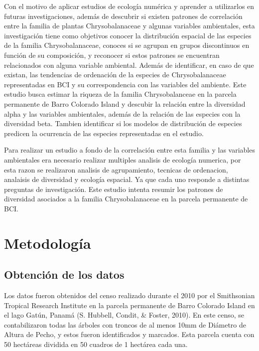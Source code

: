 \documentclass[11pt,]{article}
\begin{document}
Con el motivo de aplicar estudios de ecología numérica y aprender a
utilizarlos en futuras investigaciones, además de descubrir si existen
patrones de correlación entre la familia de plantas Chrysobalanaceae y
algunas variables ambientales, esta investigación tiene como objetivos
conocer la distribución espacial de las especies de la familia
Chrysobalanaceae, conoces si se agrupan en grupos discontinuos en
función de su composición, y reconocer si estos patrones se encuentran
relacionados con alguna variable ambiental. Además de identificar, en
caso de que existan, las tendencias de ordenación de la especies de
Chrysobalanaceae representadas en BCI y su correspondencia con las
variables del ambiente. Este estudio busca estimar la riqueza de la
familia Chrysobalanceae en la parcela permanente de Barro Colorado
Island y descubir la relación entre la diversidad alpha y las variables
ambientales, además de la relación de las especies con la diversidad
beta. Tambien identificar si los modelos de distribución de especies
predicen la ocurrencia de las especies representadas en el estudio.

Para realizar un estudio a fondo de la correlación entre esta familia y
las variables ambientales era necesario realizar multiples analisis de
ecología numerica, por esta razon se realizaron analisis de
agrupamiento, tecnicas de ordenacion, analaisis de diversidad y ecología
espacial. Ya que cada uno responde a distintas preguntas de
investigación. Este estudio intenta resumir los patrones de diversidad
asociados a la familia Chrysobalanaceae en la parcela permanente de BCI.

\section{Metodología}\label{metodologuxeda}

\subsection{Obtención de los datos}\label{obtenciuxf3n-de-los-datos}

Los datos fueron obtenidos del censo realizado durante el 2010 por el
Smithsonian Tropical Research Institute en la parcela permanente de
Barro Colorado Island en el lago Gatún, Panamá (S. Hubbell, Condit, \&
Foster, 2010). En este censo, se contabilizaron todas las árboles con
troncos de al menos 10mm de Diámetro de Altura de Pecho, y estos fueron
identificados y marcados. Esta parcela cuenta con 50 hectáreas dividida
en 50 cuadros de 1 hectárea cada una.
\end{document}
